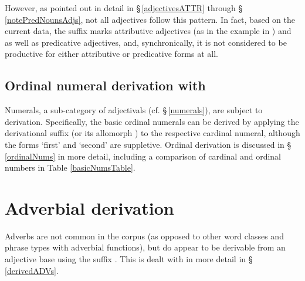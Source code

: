 However, as pointed out in detail in §\,\ref{adjectivesATTR} through §\,\ref{notePredNounsAdjs}, not all adjectives follow this pattern. In fact, based on the current data, the  suffix marks attributive adjectives (as in the example in ) and as well as predicative adjectives, %
and, synchronically, it is not considered to be productive for either attributive or predicative forms at all. 



\subsection{Ordinal numeral derivation with }\label{ordNUMderiv}
Numerals, a sub-category of adjectivals (cf. §\,\ref{numerals}), are subject to derivation. 
Specifically, the basic ordinal numerals can be derived by applying the derivational suffix  (or its allomorph ) %
to the respective cardinal numeral, although the forms  ‘first’ and  ‘second’ are suppletive. Ordinal derivation is discussed in §\,\ref{ordinalNums} in more detail, including a comparison of cardinal and ordinal numbers in Table \vref{basicNumsTable}. 





\section{Adverbial derivation}\label{advDerivation}
Adverbs are not common in the corpus (as opposed to other word classes and phrase types with adverbial functions), but do appear to be derivable from an adjective base using the suffix . This is dealt with in more detail in §\,\ref{derivedADVs}. 






